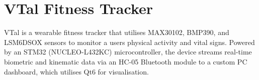 \chapter{VTal Fitness Tracker }
\hypertarget{index}{}\label{index}
\label{index_md__r_e_a_d_m_e}%
%


VTal is a wearable fitness tracker that utilises MAX30102, BMP390, and LSM6\+DSOX sensors to monitor a user\textquotesingle{}s physical activity and vital signs. Powered by an STM32 (NUCLEO-\/\+L432\+KC) microcontroller, the device streams real-\/time biometric and kinematic data via an HC-\/05 Bluetooth module to a custom PC dashboard, which utilises Qt6 for visualisation. 